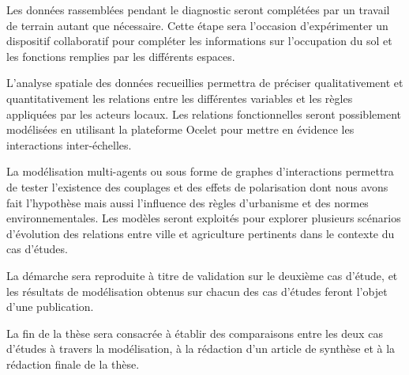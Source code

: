 
\subject{2ème année}


\item   Les données rassemblées pendant le diagnostic
	seront complétées par un travail de terrain
	autant que nécessaire.
	Cette étape sera l'occasion d'expérimenter un dispositif collaboratif
	pour compléter les informations sur l'occupation du sol
	et les fonctions remplies par les différents espaces.

\item	L'analyse spatiale des données recueillies
	permettra de préciser qualitativement et quantitativement
	les relations entre les différentes variables et les règles appliquées
	par les acteurs locaux.
	Les relations fonctionnelles seront possiblement modélisées
	en utilisant la plateforme Ocelet pour mettre en évidence
	les interactions inter-échelles.

\item La modélisation multi-agents ou sous forme de graphes d'interactions
	permettra de tester l'existence des couplages et des effets de polarisation
	dont nous avons fait l'hypothèse
	mais aussi l'influence des règles d'urbanisme et des normes environnementales.
	Les modèles seront exploités pour explorer
	plusieurs scénarios d'évolution des relations entre ville et
	agriculture pertinents dans le contexte du cas d'études.


\subject{3ème année}


\item La démarche sera reproduite à titre de validation
	sur le deuxième cas d'étude,
	et les résultats de modélisation obtenus sur chacun des cas d'études
	feront l'objet d'une publication.

\item La fin de la thèse sera consacrée à établir des comparaisons
	entre les deux cas d'études à travers la modélisation,
	à la rédaction d'un article de synthèse
	et à la rédaction finale de la thèse.

\stopitemize